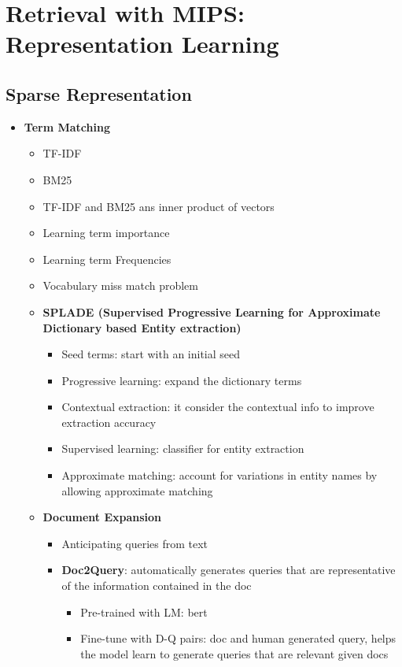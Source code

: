 \documentclass[12pt,oneside]{report}
\begin{document}
\chapter{Retrieval with MIPS: Representation Learning}
\section{Sparse Representation}
\begin{itemize}
    \item \textbf{Term Matching}
    \begin{itemize}
        \item TF-IDF
        \item BM25
        \item TF-IDF and BM25 ans inner product of vectors
        \item Learning term importance
        \item Learning term Frequencies
        \item Vocabulary miss match problem
        \item \textbf{SPLADE (Supervised Progressive Learning for Approximate Dictionary based Entity extraction)}
        \begin{itemize}
            \item Seed terms: start with an initial seed 
            \item Progressive learning: expand the dictionary terms
            \item Contextual extraction: it consider the contextual info to improve extraction accuracy
            \item Supervised learning: classifier for entity extraction
            \item Approximate matching: account for variations in entity names by allowing approximate matching
        \end{itemize}
        \item \textbf{Document Expansion}
        \begin{itemize}
            \item Anticipating queries from text
            \item \textbf{Doc2Query}: automatically generates queries that are representative of the information contained in the doc
            \begin{itemize}
                \item Pre-trained with LM: bert
                \item Fine-tune with D-Q pairs: doc and human generated query, helps the model learn to generate queries that are relevant given docs

\end{itemize}
\end{itemize}
\end{itemize}
\end{itemize}
\end{document}
